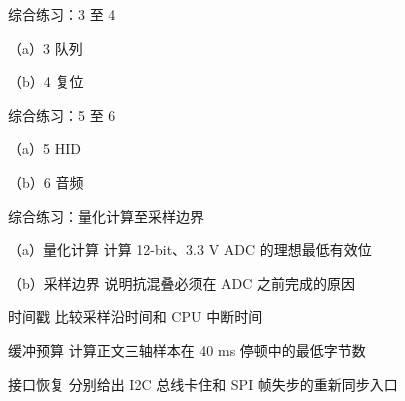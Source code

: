 \begin{chapterexercise}{综合练习：3 至 4}
\begin{exercisesubproblem}{（a）3}
队列
\end{exercisesubproblem}
\begin{exercisesubproblem}{（b）4}
复位
\end{exercisesubproblem}
\end{chapterexercise}

\begin{chapterexercise}{综合练习：5 至 6}
\begin{exercisesubproblem}{（a）5}
HID
\end{exercisesubproblem}
\begin{exercisesubproblem}{（b）6}
音频
\end{exercisesubproblem}
\end{chapterexercise}

\begin{chapterexercise}{综合练习：量化计算至采样边界}
\begin{exercisesubproblem}{（a）量化计算}
计算 12-bit、3.3 V ADC 的理想最低有效位
\end{exercisesubproblem}
\begin{exercisesubproblem}{（b）采样边界}
说明抗混叠必须在 ADC 之前完成的原因
\end{exercisesubproblem}
\end{chapterexercise}

\begin{chapterexercise}{时间戳}
比较采样沿时间和 CPU 中断时间
\end{chapterexercise}

\begin{chapterexercise}{缓冲预算}
计算正文三轴样本在 40 ms 停顿中的最低字节数
\end{chapterexercise}

\begin{chapterexercise}{接口恢复}
分别给出 I2C 总线卡住和 SPI 帧失步的重新同步入口
\end{chapterexercise}

